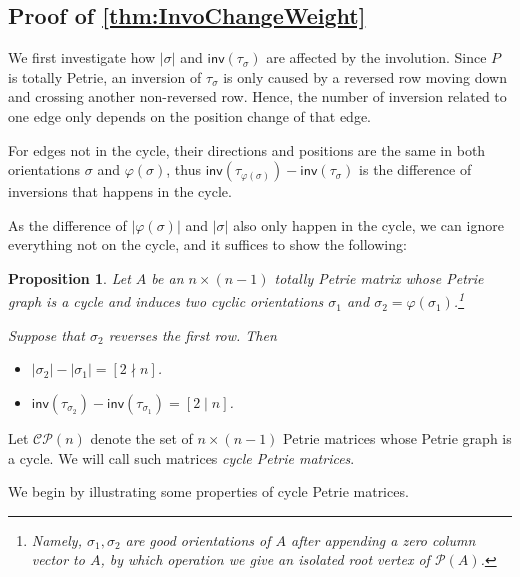 \documentclass[pdflatex,sn-mathphys-num]{sn-jnl}%
\theoremstyle{thmstyleone}%
\newtheorem{proposition}[theorem]{Proposition}
\theoremstyle{thmstyletwo}%
\theoremstyle{thmstylethree}%
\numberwithin{equation}{section}
\newcommand{\inv}{\mathsf{inv}}
\begin{document}
        
    \subsection{Proof of \texorpdfstring{\cref{thm:InvoChangeWeight}}{Theorem 6.2}}\label{sec:proofMotzkin}
        We first investigate how $|\sigma|$ and $\inv(\tau_\sigma)$ are affected by the involution. 
        Since $P$ is totally Petrie, an inversion of $\tau_{\sigma}$ is only caused by a reversed row moving down and crossing another non-reversed row. Hence, the number of inversion related to one edge only depends on the position change of that edge. 
        
        For edges not in the cycle, their directions and positions are the same in both orientations $\sigma$ and $\varphi(\sigma)$, thus $\inv(\tau_{\varphi(\sigma)})-\inv(\tau_\sigma)$ is the difference of inversions that happens in the cycle.
        
        As the difference of $|\varphi(\sigma)|$ and $|\sigma|$ also only happen in the cycle, we can ignore everything not on the cycle, and it suffices to show the following:
        \begin{proposition}\label{lemma:cycleCase}
            Let $A$ be an $n\times(n-1)$ totally Petrie matrix whose Petrie graph is a cycle and induces two cyclic orientations $\sigma_1$ and $\sigma_2=\varphi(\sigma_1)$.\footnote{Namely, $\sigma_1,\sigma_2$ are good orientations of $A$ after appending a zero column vector to $A$, by which operation we give an isolated root vertex of $\mathcal{P}(A)$.}
            
            Suppose that $\sigma_2$ reverses the first row. Then
            
            \begin{itemize}
                \item $|\sigma_2|-|\sigma_1| = [2\nmid n]$.
                \item $\inv(\tau_{\sigma_2})-\inv(\tau_{\sigma_1})=[2\mid n]$.
            \end{itemize}
        \end{proposition}

        Let $\mathcal{CP}(n)$ denote the set of $n\times (n-1)$ Petrie matrices whose Petrie graph is a cycle. We will call such matrices \emph{cycle Petrie matrices}.
        
        We begin by illustrating some properties of cycle Petrie matrices. 
         
\end{document}
